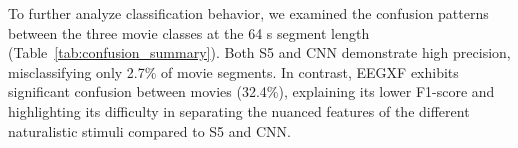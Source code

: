 \documentclass{article}
\newcommand{\eegtrans}{EEGXF}
\begin{document}



To further analyze classification behavior, we examined the confusion patterns between the three movie classes at the 64 s segment length (Table~\ref{tab:confusion_summary}). Both S5 and CNN demonstrate high precision, misclassifying only 2.7\% of movie segments. In contrast, \eegtrans{} exhibits significant confusion between movies (32.4\%), explaining its lower F1-score and highlighting its difficulty in separating the nuanced features of the different naturalistic stimuli compared to S5 and CNN.
\end{document}
